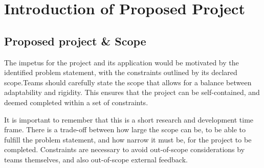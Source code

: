 \documentclass{report}
\begin{document}


      

 

 
		
\chapter{Introduction of Proposed Project}

	\section{Proposed project \& Scope}
        The impetus for the project and its application would be motivated by the identified problem statement, with the constraints outlined by its declared scope.Teams should carefully state the scope that allows for a balance between adaptability and rigidity. This ensures that the project can be self-contained, and deemed completed within a set of constraints. 
        \newline

        \noindent
         It is important to remember that this is a short research and development time frame. There is a trade-off between how large the scope can be, to be able to fulfill the problem statement, and how narrow it must be, for the project to be completed. Constraints are necessary to avoid out-of-scope considerations by teams themselves, and also out-of-scope external feedback.
\end{document}
